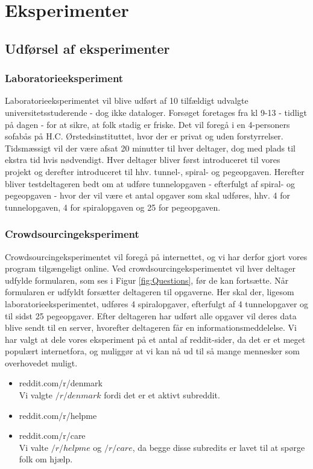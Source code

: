 \chapter*{Eksperimenter}

\section*{Udførsel af eksperimenter}

\subsection*{Laboratorieeksperiment}
Laboratorieeksperimentet vil blive udført af 10 tilfældigt udvalgte universitetsstuderende - dog ikke dataloger.
Forsøget foretages fra kl 9-13 - tidligt på dagen - for at sikre, at folk stadig er friske. Det vil foregå i en 4-personers sofabås på H.C. Ørstedsinstituttet, hvor der er privat og uden forstyrrelser.
Tidsmæssigt vil der være afsat 20 minutter til hver deltager, dog med plads til ekstra tid hvis nødvendigt.
Hver deltager bliver først introduceret til vores projekt og derefter introduceret til hhv. tunnel-, spiral- og pegeopgaven.
Herefter bliver testdeltageren bedt om at udføre tunnelopgaven - efterfulgt af spiral- og pegeopgaven - hvor der vil være et antal opgaver som skal udføres, hhv. 4 for tunnelopgaven, 4 for spiralopgaven og 25 for pegeopgaven.

\subsection*{Crowdsourcingeksperiment}
Crowdsourcingeksperimentet vil foregå på internettet, og vi har derfor gjort vores program tilgængeligt online. Ved crowdsourcingeksperimentet vil hver deltager udfylde formularen, som ses i Figur \ref{fig:Questions}, før de kan fortsætte. Når formularen er udfyldt forsætter deltageren til opgaverne. Her skal der, ligesom laboratorieeksperimentet, udføres 4 spiralopgaver, efterfulgt af 4 tunnelopgaver og til sidst 25 pegeopgaver. Efter deltageren har udført alle opgaver vil deres data blive sendt til en server, hvorefter deltageren får en informationsmeddelelse.
Vi har valgt at dele vores eksperiment på et antal af reddit-sider, da det er et meget populært internetfora, og muliggør at vi kan nå ud til så mange mennesker som overhovedet muligt.
\begin{itemize}
\item reddit.com/r/denmark\\
Vi valgte $/r/denmark$ fordi det er et aktivt subreddit.
\item reddit.com/r/helpme\\
\item reddit.com/r/care\\
Vi valte $/r/helpme$ og $/r/care$, da begge disse subredits er lavet til at spørge folk om hjælp.
\end{itemize}

